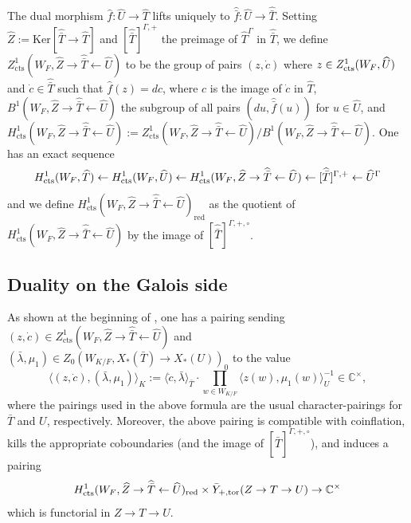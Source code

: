 \documentclass{amsart}
\theoremstyle{definition}
\theoremstyle{remark}
\newcommand\cts{\textnormal{cts}}
\begin{document}
The dual morphism $\hat{f} \colon \widehat{U} \to \widehat{T}$ lifts uniquely to $\hat{\bar{f}} \colon \widehat{U} \to \widehat{\bar{T}}$. Setting $\widehat{Z}:=\text{Ker}[\widehat{\bar{T}} \to \widehat{T}]$ and $[\widehat{\bar{T}}]^{\Gamma,+}$ the preimage of $\widehat{T}^{\Gamma}$ in $\widehat{\bar{T}}$, we define $Z^{1}_{\text{cts}}(W_{F}, \widehat{Z} \to \widehat{\bar{T}} \leftarrow \widehat{U})$ to be the group of pairs $(z,\dot{c})$ where $z \in Z^{1}_{\cts}(W_{F},\widehat{U})$ and $\dot{c} \in \widehat{\bar{T}}$ such that $\hat{f}(z)=dc$, where $c$ is the image of $\dot{c}$ in $\widehat{T}$, $B^{1}(W_{F}, \widehat{Z} \to \widehat{\bar{T}} \leftarrow \widehat{U})$ the subgroup of all pairs $(du, \hat{\bar{f}}(u))$ for $u \in \widehat{U}$, and $H^{1}_{\text{cts}}(W_{F}, \widehat{Z} \to \widehat{\bar{T}} \leftarrow \widehat{U}) :=Z^{1}_{\text{cts}}(W_{F}, \widehat{Z} \to \widehat{\bar{T}} \leftarrow \widehat{U})/B^{1}(W_{F}, \widehat{Z} \to \widehat{\bar{T}} \leftarrow \widehat{U})$. One has an exact sequence
\begin{equation*}
    H^{1}_{\cts}(W_{F}, \widehat{T}) \leftarrow  H^{1}_{\cts}(W_{F}, \widehat{U}) \leftarrow H^{1}_{\text{cts}}(W_{F}, \widehat{Z} \to \widehat{\bar{T}} \leftarrow \widehat{U}) \leftarrow [\widehat{\bar{T}}]^{\Gamma,+} \leftarrow \widehat{U}^{\Gamma}
\end{equation*}
and we define $H^{1}_{\text{cts}}(W_{F}, \widehat{Z} \to \widehat{\bar{T}} \leftarrow \widehat{U})_{\text{red}}$ as the quotient of $H^{1}_{\text{cts}}(W_{F}, \widehat{Z} \to \widehat{\bar{T}} \leftarrow \widehat{U})$ by the image of $[\widehat{\bar{T}}]^{\Gamma,+,\circ}$.

\subsection{Duality on the Galois side}
As shown at the beginning of \cite[\S 5.2]{Kal26b}, one has a pairing sending $(z,\dot{c}) \in Z^{1}_{\text{cts}}(W_{F}, \widehat{Z} \to \widehat{\bar{T}} \leftarrow \widehat{U})$ and $(\bar{\lambda},\mu_{1}) \in  Z_{0}(W_{K/F}, X_{*}(\bar{T}) \to X_{*}(U))_{0}$ to the value
\begin{equation*}
    \langle (z,\dot{c}) , (\bar{\lambda},\mu_{1}) \rangle_{K} := \langle \dot{c}, \bar{\lambda} \rangle_{\bar{T}} \cdot \prod_{w \in W_{K/F}} \langle z(w), \mu_{1}(w) \rangle_{U}^{-1} \in \mathbb{C}^{\times},
\end{equation*}
where the pairings used in the above formula are the usual character-pairings for $\bar{T}$ and $U$, respectively. Moreover, the above pairing is compatible with coinflation, kills the appropriate coboundaries (and the image of $[\widehat{\bar{T}}]^{\Gamma,+,\circ}$), and induces a pairing
\begin{equation}\label{eq:dualpairing}
H^{1}_{\text{cts}}(W_{F}, \widehat{Z} \to \widehat{\bar{T}} \leftarrow \widehat{U})_{\text{red}} \times \bar{Y}_{+,\textnormal{tor}}(Z \to T \to U) \to \mathbb{C}^{\times}
\end{equation}
which is functorial in $Z \to T \to U$.
\end{document}
